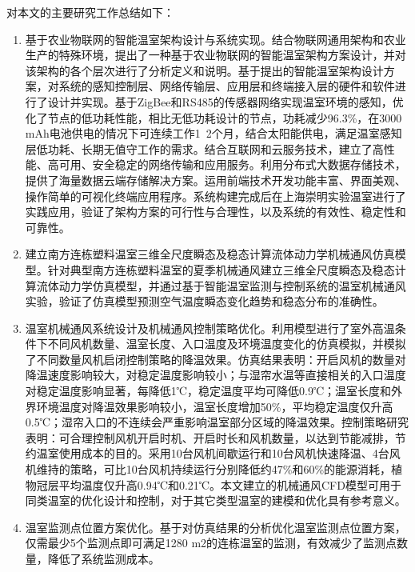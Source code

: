 对本文的主要研究工作总结如下：
	\begin{enumerate}
		\item 基于农业物联网的智能温室架构设计与系统实现。结合物联网通用架构和农业生产的特殊环境，提出了一种基于农业物联网的智能温室架构方案设计，并对该架构的各个层次进行了分析定义和说明。基于提出的智能温室架构设计方案，对系统的感知控制层、网络传输层、应用层和终端接入层的硬件和软件进行了设计并实现。基于ZigBee和RS485的传感器网络实现温室环境的感知，优化了节点的低功耗性能，相比无低功耗设计的节点，功耗减少96.3\%，在3000 mAh电池供电的情况下可连续工作1~2个月，结合太阳能供电，满足温室感知层低功耗、长期无值守工作的需求。结合互联网和云服务技术，建立了高性能、高可用、安全稳定的网络传输和应用服务。利用分布式大数据存储技术，提供了海量数据云端存储解决方案。运用前端技术开发功能丰富、界面美观、操作简单的可视化终端应用程序。系统构建完成后在上海崇明实验温室进行了实践应用，验证了架构方案的可行性与合理性，以及系统的有效性、稳定性和可靠性。
		\item 建立南方连栋塑料温室三维全尺度瞬态及稳态计算流体动力学机械通风仿真模型。针对典型南方连栋塑料温室的夏季机械通风建立三维全尺度瞬态及稳态计算流体动力学仿真模型，并通过基于智能温室监测与控制系统的温室机械通风实验，验证了仿真模型预测空气温度瞬态变化趋势和稳态分布的准确性。
		\item 温室机械通风系统设计及机械通风控制策略优化。利用模型进行了室外高温条件下不同风机数量、温室长度、入口温度及环境温度变化的仿真模拟，并模拟了不同数量风机启闭控制策略的降温效果。仿真结果表明：开启风机的数量对降温速度影响较大，对稳定温度影响较小；与湿帘水温等直接相关的入口温度对稳定温度影响显著，每降低1℃，稳定温度平均可降低0.9℃；温室长度和外界环境温度对降温效果影响较小，温室长度增加50\%，平均稳定温度仅升高0.5℃；湿帘入口的不连续会严重影响温室部分区域的降温效果。控制策略研究表明：可合理控制风机开启时机、开启时长和风机数量，以达到节能减排，节约温室使用成本的目的。采用10台风机间歇运行和10台风机快速降温、4台风机维持的策略，可比10台风机持续运行分别降低约47\%和60\%的能源消耗，植物冠层平均温度仅升高0.94℃和0.21℃。本文建立的机械通风CFD模型可用于同类温室的优化设计和控制，对于其它类型温室的建模和优化具有参考意义。
		\item 温室监测点位置方案优化。基于对仿真结果的分析优化温室监测点位置方案，仅需最少5个监测点即可满足1280 m2的连栋温室的监测，有效减少了监测点数量，降低了系统监测成本。
	\end{enumerate}
